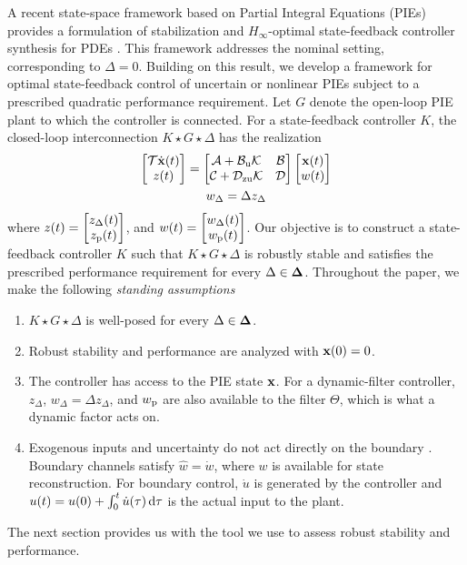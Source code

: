 A recent state-space framework based on Partial Integral Equations (PIEs)
provides a formulation of stabilization and
$H_\infty$-optimal state-feedback controller synthesis for PDEs
\cite{shivaknew}. This framework addresses the nominal setting, corresponding
to $\Delta=0$. Building on this result, we develop a framework for
optimal state-feedback control of uncertain or nonlinear PIEs subject to a
prescribed quadratic performance requirement. Let $G$ denote the open-loop
PIE plant to which the controller is connected. For a state-feedback controller $K$, the closed-loop
interconnection $K\star G\star\Delta$ has the realization
\begin{gather*}
    \begin{bmatrix}\mathcal{T}\dot{\mathbf{x}}(t)\\z(t)\end{bmatrix} = \begin{bmatrix}\mathcal{A}+\mathcal{B}_{\mathrm{u}}\mathcal{K} & \mathcal{B}\\
    \mathcal{C}+\mathcal{D}_{\mathrm{zu}}\mathcal{K}& \mathcal{D}\end{bmatrix}\begin{bmatrix}\mathbf{x}(t) \\ w(t)\end{bmatrix} \\
    w_\Delta = \Delta z_\Delta
\end{gather*}
where $z(t)=\begin{bmatrix}z_\Delta(t)\\z_{\mathrm{p}}(t)\end{bmatrix}$, and $w(t) = \begin{bmatrix}w_\Delta(t) \\ w_{\mathrm{p}}(t)\end{bmatrix}$.
Our objective is to construct a state-feedback controller $K$ such that
$K\star G\star\Delta$ is robustly stable and satisfies the prescribed
performance requirement for every $\Delta\in\mathbf{\Delta}$.
Throughout the paper, we make the following \emph{standing assumptions}
\begin{enumerate}[label=(A.\arabic*),ref=A.\arabic*,leftmargin=*]
\item\label{ass:well-posedness}
$K\star G\star\Delta$ is well-posed for every
$\Delta\in\mathbf{\Delta}$.
\item\label{ass:initial-conditions}
Robust stability and performance are analyzed with $\mathbf{x}(0)=0$.
\item\label{ass:signal-availability}
The controller has access to the PIE state $\mathbf{x}$. For a dynamic-filter
controller, $z_\Delta$, $w_\Delta=\Delta z_\Delta$, and
$w_{{\mathrm{p}}}$ are also available to the filter $\Theta$, which is what
a dynamic factor acts on.
\item\label{ass:boundary-channels}
Exogenous inputs and uncertainty do not act directly on the boundary
\cite[Sec.~III-B]{shivaknew}. Boundary channels satisfy
$\hat w=\dot w$, where $w$ is available for state reconstruction. For boundary
control, $\dot u$ is generated by the controller and
$u(t)=u(0)+\int_0^t\dot u(\tau)\,{\mathrm{d}}\tau$ is the actual input to the plant.
\end{enumerate}
The next section provides us with the tool we use to assess robust stability and 
performance.
